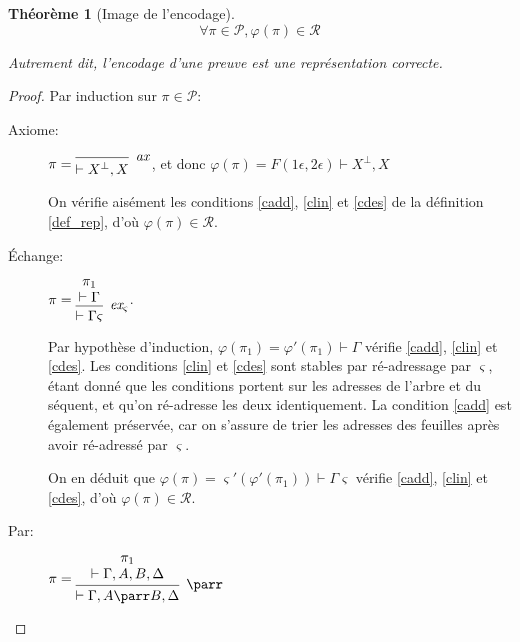 \documentclass[11pt,a4paper]{article}
\theoremstyle{plain}
\newtheorem{theorem}{Théorème}
\theoremstyle{definition}
\theoremstyle{remark}
\newcommand*{\orth}{^\perp}
\newcommand*{\namedproofv}[2]{\hypo{#1}\infer[no rule]{1}{\vdash #2}}
\newcommand*{\axv}[1]{\infer{0}[\ensuremath{\mathit{ax}}]{\vdash #1}}
\newcommand*{\parrv}[1]{\infer{1}[\ensuremath{\parr}]{\vdash #1}}
\newcommand*{\permv}[2]{\infer{1}[\ensuremath{\textit{ex}_{#1}}]{\vdash #2}}
\newcommand*{\permapp}[2]{#2 #1}
\newcommand*{\someperm}{\varsigma}
\newcommand*{\someproof}{\pi}
\newcommand*{\sequent}{\Gamma}
\newcommand*{\sequentbis}{\Delta}
\newcommand*{\proofs}{\ensuremath{\mathcal{P}}}
\newcommand*{\representations}{\ensuremath{\mathcal{R}}}
\newcommand*{\encode}{\ensuremath{\varphi}}
\begin{document}
\begin{theorem}[Image de l'encodage]
    \begin{equation*}
    \forall \someproof \in \proofs, \encode \left( \someproof \right) \in \representations
    \end{equation*}

    Autrement dit, l'encodage d'une preuve est une représentation correcte.
\end{theorem}

\begin{proof}
    Par induction sur $\someproof \in \proofs$:
    \begin{description}
    \item[Axiome:] $\someproof =
    \begin{prooftree}
        \axv{X\orth, X}
    \end{prooftree}$,
    et donc $\encode \left( \someproof \right) = F(1 \epsilon, 2 \epsilon) \vdash X\orth, X$

    On vérifie aisément les conditions \ref{cadd}, \ref{clin} et \ref{cdes} de la définition \ref{def_rep}, d'où $\encode \left( \someproof \right) \in \representations$.

    \item[Échange:] $\someproof =
    \begin{prooftree}
        \namedproofv{\pi_1}{\sequent}
        \permv{\someperm}{\permapp{\someperm}{\sequent}}
    \end{prooftree}$.
    
    Par hypothèse d'induction, $\encode \left( \pi_1 \right) = \encode ' \left( \pi_1 \right) \vdash \sequent$ vérifie \ref{cadd}, \ref{clin} et \ref{cdes}. Les conditions \ref{clin} et \ref{cdes} sont stables par ré-adressage par $\someperm$, étant donné que les conditions portent sur les adresses de l'arbre et du séquent, et qu'on ré-adresse les deux identiquement. La condition \ref{cadd} est également préservée, car on s'assure de trier les adresses des feuilles après avoir ré-adressé par $\someperm$.

    On en déduit que $\encode \left( \someproof \right) = \someperm' \left( \encode ' \left( \pi_1 \right) \right) \vdash \permapp{\someperm}{\sequent}$ vérifie \ref{cadd}, \ref{clin} et \ref{cdes}, d'où $\encode \left( \someproof \right) \in \representations$.

    \item[Par:] $\someproof =
    \begin{prooftree}
      \namedproofv{\pi_1}{\sequent, A, B, \sequentbis}
      \parrv{\sequent, A \parr B, \sequentbis}
    \end{prooftree}$


\end{description}
\end{proof}
\end{document}
